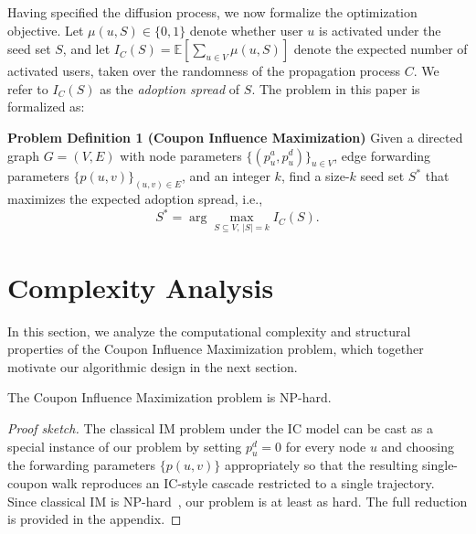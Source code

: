 \documentclass{article}
\begin{document}
Having specified the diffusion process, we now formalize the optimization objective. Let $\mu(u, S) \in \{0, 1\}$ denote whether user $u$ is activated under the seed set $S$, and let $I_C(S) = \mathbb{E}[\sum_{u \in V} \mu(u, S)]$ denote the expected number of activated users, taken over the randomness of the propagation process $C$. We refer to $I_C(S)$ as the \emph{adoption spread} of $S$. The problem in this paper is formalized as:

\textbf{Problem Definition 1 (Coupon Influence Maximization)}
Given a directed graph $G = (V, E)$ with node parameters $\{(p_u^a, p_u^d)\}_{u \in V}$, edge forwarding parameters $\{p(u, v)\}_{(u, v) \in E}$, and an integer $k$, find a size-$k$ seed set $S^*$ that maximizes the expected adoption spread, i.e.,
\begin{equation}
S^* = \arg\max_{S \subseteq V, \, |S| = k} I_C(S).
\end{equation}











\section{Complexity Analysis}

In this section, we analyze the computational complexity and structural properties of the Coupon Influence Maximization problem, which together motivate our algorithmic design in the next section.

\begin{theorem}
\label{thm:nphard}
The Coupon Influence Maximization problem is NP-hard.
\end{theorem}

\begin{proof}[Proof sketch]
The classical IM problem under the IC model can be cast as a special instance of our problem by setting $p_u^d = 0$ for every node $u$ and choosing the forwarding parameters $\{p(u, v)\}$ appropriately so that the resulting single-coupon walk reproduces an IC-style cascade restricted to a single trajectory. Since classical IM is NP-hard~\cite{kempe2003maximizing}, our problem is at least as hard. The full reduction is provided in the appendix.
\end{proof}
\end{document}
